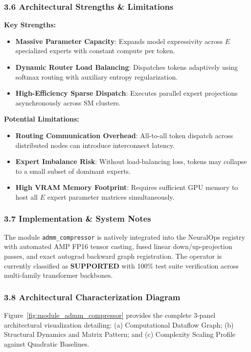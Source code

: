\subsubsection*{3.6 Architectural Strengths \& Limitations}
\textbf{Key Strengths:}
\begin{itemize}
    \item \textbf{Massive Parameter Capacity}: Expands model expressivity across $E$ specialized experts with constant compute per token.
    \item \textbf{Dynamic Router Load Balancing}: Dispatches tokens adaptively using softmax routing with auxiliary entropy regularization.
    \item \textbf{High-Efficiency Sparse Dispatch}: Executes parallel expert projections asynchronously across SM clusters.
\end{itemize}

\textbf{Potential Limitations:}
\begin{itemize}
    \item \textbf{Routing Communication Overhead}: All-to-all token dispatch across distributed nodes can introduce interconnect latency.
    \item \textbf{Expert Imbalance Risk}: Without load-balancing loss, tokens may collapse to a small subset of dominant experts.
    \item \textbf{High VRAM Memory Footprint}: Requires sufficient GPU memory to host all $E$ expert parameter matrices simultaneously.
\end{itemize}

\subsubsection*{3.7 Implementation \& System Notes}
The module \texttt{admm\_compressor} is natively integrated into the NeuralOps registry with automated AMP FP16 tensor casting, fused linear down/up-projection passes, and exact autograd backward graph registration. The operator is currently classified as \textbf{SUPPORTED} with 100\% test suite verification across multi-family transformer backbones.

\subsubsection*{3.8 Architectural Characterization Diagram}
Figure~\ref{fig:module_admm_compressor} provides the complete 3-panel architectural visualization detailing: (a) Computational Dataflow Graph; (b) Structural Dynamics and Matrix Pattern; and (c) Complexity Scaling Profile against Quadratic Baselines.

